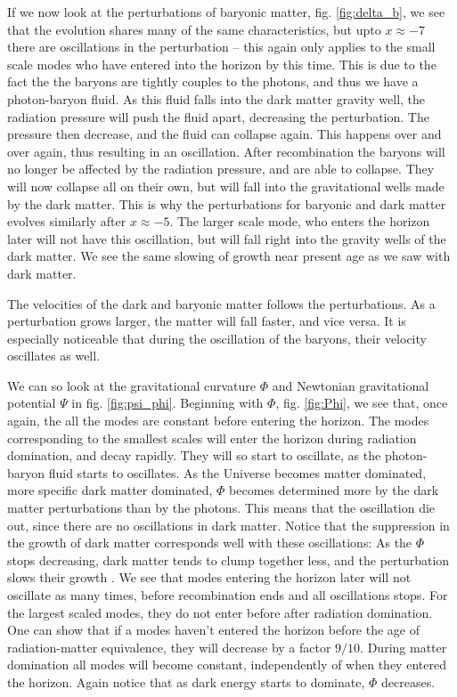 \documentclass[a4paper,norsk, 10pt]{article}
\begin{document}
If we now look at the perturbations of baryonic matter, fig. \ref{fig:delta_b}, we see that the evolution shares many of the same characteristics, but upto $x \approx -7$ there are oscillations in the perturbation -- this again only applies to the small scale modes who have entered into the horizon by this time. This is due to the fact the the baryons are tightly couples to the photons, and thus we have a photon-baryon fluid. As this fluid falls into the dark matter gravity well, the radiation pressure will push the fluid apart, decreasing the perturbation. The pressure then decrease, and the fluid can collapse again. This happens over and over again, thus resulting in an oscillation. After recombination the baryons will no longer be affected by the radiation pressure, and are able to collapse. They will now collapse all on their own, but will fall into the gravitational wells made by the dark matter. This is why the perturbations for baryonic and dark matter evolves similarly after $x\approx -5$. The larger scale mode, who enters the horizon later will not have this oscillation, but will fall right into the gravity wells of the dark matter. We see the same slowing of growth near present age as we saw with dark matter.

The velocities of the dark and baryonic matter follows the perturbations. As a perturbation grows larger, the matter will fall faster, and vice versa. It is especially noticeable that during the oscillation of the baryons, their velocity oscillates as well. 

We can so look at the gravitational curvature $\Phi$ and Newtonian gravitational potential $\Psi$ in fig. \ref{fig:psi_phi}. Beginning with $\Phi$, fig. \ref{fig:Phi}, we see that, once again, the all the modes are constant before entering the horizon. The modes corresponding to the smallest scales will enter the horizon during radiation domination, and decay rapidly. They will so start to oscillate, as the photon-baryon fluid starts to oscillates. As the Universe becomes matter dominated, more specific dark matter dominated, $\Phi$ becomes determined more by the dark matter perturbations than by the photons. This means that the oscillation die out, since there are no oscillations in dark matter. Notice that the suppression in the growth of dark matter corresponds well with these oscillations: As the $\Phi$ stops decreasing, dark matter tends to clump together less, and the perturbation slows their growth . We see that modes entering the horizon later will not oscillate as many times, before recombination ends and all oscillations stops. For the largest scaled modes, they do not enter before after radiation domination. One can show that if a modes haven't entered the horizon before the age of radiation-matter equivalence, they will decrease by a factor $9/10$. During matter domination all modes will become constant, independently of when they entered the horizon. Again notice that as dark energy starts to dominate, $\Phi$ decreases.
\end{document}

